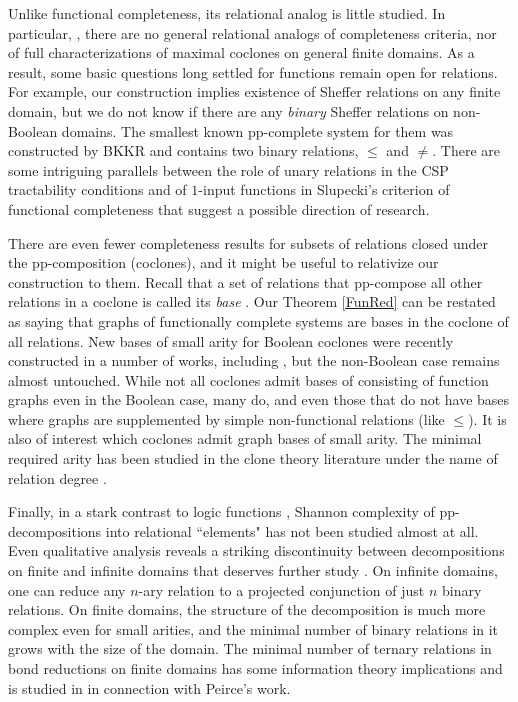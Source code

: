 \documentclass[11pt]{article}
\theoremstyle{plain}
\theoremstyle{definition}
\begin{document}
Unlike functional completeness, its relational analog is little studied. In particular, \cite{Ros76}, there are no general relational analogs of  completeness criteria, nor of full characterizations of maximal coclones on general finite domains. As a result, some basic questions long settled for functions remain open for relations. For example, our construction implies existence of Sheffer relations on any finite domain, but we do not know if there are any {\it binary} Sheffer relations on non-Boolean domains. The smallest known pp-complete system for them was constructed by BKKR and contains two binary relations, $\leq$ and $\neq$. There are some intriguing parallels between the role of unary relations in the CSP tractability conditions \cite{BJK} and of $1$-input functions in Slupecki's criterion of functional completeness \cite{Ros77} that suggest a possible direction of research.

There are even fewer completeness results for subsets of relations closed under the pp-composition (coclones), and it might be useful to relativize our construction to them. Recall that a set of relations that pp-compose all other relations in a coclone is called its {\it base} \cite{BRSV05}. Our Theorem \ref{FunRed} can be restated as saying that graphs of functionally complete systems are bases in the coclone of all relations. New bases of small arity for Boolean coclones were recently constructed in a number of works, including \cite{BRSV05,Lag17,Mar98}, but the non-Boolean case remains almost untouched. While not all coclones admit bases of consisting of function graphs even in the Boolean case, many do, and even those that do not have bases where graphs are supplemented by simple non-functional relations (like $\leq$). It is also of interest which coclones admit graph bases of small arity. The minimal required arity has been studied in the clone theory literature under the name of relation degree \cite[ch.\,10]{Lau}.

Finally, in a stark contrast to logic functions \cite{Ros76}, Shannon complexity of pp-decompositions into relational ``elements" has not been studied almost at all. Even qualitative analysis reveals a striking discontinuity between decompositions on finite and infinite domains that deserves further study \cite{Kosh23}. On infinite domains, one can reduce any $n$-ary relation to a projected conjunction of just $n$ binary relations. On finite domains, the structure of the decomposition is much more complex even for small arities, and the minimal number of binary relations in it grows with the size of the domain. The minimal number of ternary relations in bond reductions on finite domains has some information theory implications and is studied in \cite{Kosh23} in connection with Peirce's work.
\end{document}
